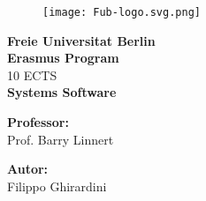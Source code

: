 \begin{titlepage} %
\begin{figure}[t] %
    \centering\texttt{[image: Fub-logo.svg.png]}
\end{figure}
\vspace{20mm}

\begin{Large}
 \begin{center}
	\textbf{Freie Universitat Berlin\\ Erasmus Program\\}
	\vspace{20mm}
    {\LARGE{10 ECTS}}\\
	\vspace{10mm}
	{\huge{\bf Systems Software}}\\
\end{center}
\end{Large}


\vspace{36mm}
\begin{minipage}[t]{0.47\textwidth}
	{\large{\bf Professor:}\\ \large{Prof. Barry Linnert}}
\end{minipage}
\hfill
\begin{minipage}[t]{0.47\textwidth}\raggedleft
	{\large{\bf Autor:}\\ \large{Filippo Ghirardini}}
\end{minipage}

\vspace{25mm}

\hrulefill

\vspace{5mm}


\end{titlepage}